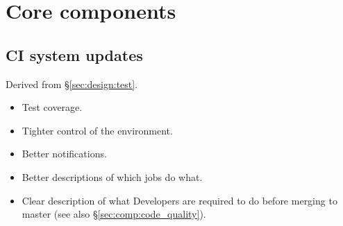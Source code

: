 \section{Core components}
\label{sec:comp}









\subsection{CI system updates}
\label{sec:comp:ci}

Derived from \S\ref{sec:design:test}.


\begin{itemize}

  \item{Test coverage.}
  \item{Tighter control of the environment.}
  \item{Better notifications.}
  \item{Better descriptions of which jobs do what.}
  \item{Clear description of what Developers are required to do before merging
  to master (see also \S\ref{sec:comp:code_quality}).}

\end{itemize}






